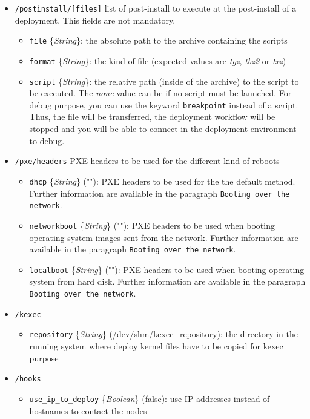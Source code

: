 \documentclass[a4wide,10pt,oneside]{book}
\newcommand{\ypath}[1]{\texttt{#1}}
\newcommand{\yfield}[2]{\texttt{#1} {\small\{{\emph{#2}}\}}:}
\newcommand{\yfieldd}[3]{\texttt{#1} {\small\{{\emph{#2}}\}} {\small(}#3{\small)}:}
\begin{document}
\begin{itemize}
  \item \ypath{/postinstall/[files]} list of post-install to execute at the post-install of a deployment. This fields are not mandatory. 
  \begin{itemize}
    \item \yfield{file}{String} the absolute path to the archive containing the scripts
    \item \yfield{format}{String} the kind of file (expected values are \emph{tgz}, \emph{tbz2} or \emph{txz})
    \item \yfield{script}{String} the relative path (inside of the archive) to the script to be executed. The \textit{none} value can be if no script must be launched. For debug purpose, you can use the keyword \texttt{breakpoint} instead of a script. Thus, the file will be transferred, the deployment workflow will be stopped and you will be able to connect in the deployment environment to debug.
  \end{itemize}

  \item \ypath{/pxe/headers} PXE headers to be used for the different kind of reboots
  \begin{itemize}
    \item \yfieldd{dhcp}{String}{""} PXE headers to be used for the the default method. Further information are available in the paragraph \texttt{Booting over the network}.
    \item \yfieldd{networkboot}{String}{""} PXE headers to be used when booting operating system images sent from the network. Further information are available in the paragraph \texttt{Booting over the network}.
    \item \yfieldd{localboot}{String}{""} PXE headers to be used when booting operating system from hard disk. Further information are available in the paragraph \texttt{Booting over the network}.
  \end{itemize}

  \item \ypath{/kexec}
  \begin{itemize}
    \item \yfieldd{repository}{String}{/dev/shm/kexec\_repository} the directory in the running system where deploy kernel files have to be copied for kexec purpose
  \end{itemize}

  \item \ypath{/hooks}
  \begin{itemize}
    \item \yfieldd{use\_ip\_to\_deploy}{Boolean}{false} use IP addresses instead of hostnames to contact the nodes
  \end{itemize}


\end{itemize}
\end{document}
